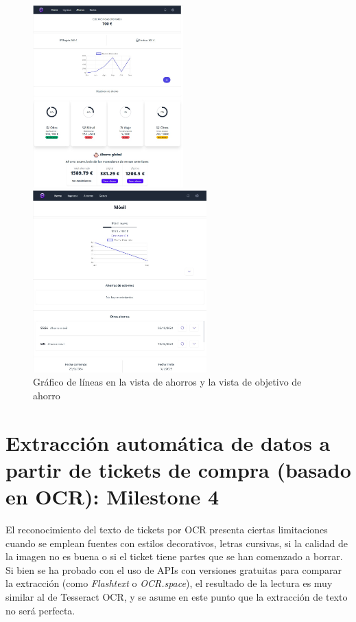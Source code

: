 \begin{figure}[ht!]
    \centering
    \begin{minipage}{0.45\textwidth}
        \centering
        \includegraphics[height=70mm]{imagenes/M3-ahorros.jpg}
    \end{minipage}\hfill
    \begin{minipage}{0.45\textwidth}
        \centering
        \includegraphics[height=70mm]{imagenes/M3-ahorros-objetivo.jpg}
    \end{minipage}
    \caption{Gráfico de líneas en la vista de ahorros y la vista de objetivo de ahorro}
    \label{fig:line_chart}
\end{figure}


\section{Extracción automática de datos a partir de tickets de compra (basado en OCR): Milestone 4}\label{chap:milestone4}
El reconocimiento del texto de tickets por OCR presenta ciertas limitaciones cuando se emplean fuentes con estilos decorativos, letras cursivas, si la calidad de la imagen no es buena o si el ticket tiene partes que se han comenzado a borrar. Si bien se ha probado con el uso de APIs con versiones gratuitas para comparar la extracción (como \textit{Flashtext} o \textit{OCR.space}), el resultado de la lectura es muy similar al de Tesseract OCR, y se asume en este punto que la extracción de texto no será perfecta.

